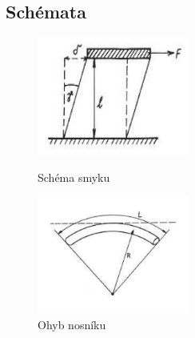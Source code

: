 \documentclass[english]{article}
\begin{document}
\clearpage
\subsection{Schémata}

	\begin{figure}[h!]
	\centering
	\begin{minipage}{.45\textwidth}
	  \centering
					\includegraphics[width=5cm]{att/smyk.pdf}
					\caption{Schéma smyku \cite{bib:zadani}}
					\label{fig:s_smyk}
	\end{minipage}%
	\hfill
	\begin{minipage}{.45\textwidth}
	  \centering
					\includegraphics[width=5cm]{att/ohyb_nosniku.pdf}
					\caption{Ohyb nosníku \cite{bib:zadani}}
					\label{fig:s_ohyb}
	\end{minipage}
	\end{figure}
\end{document}
